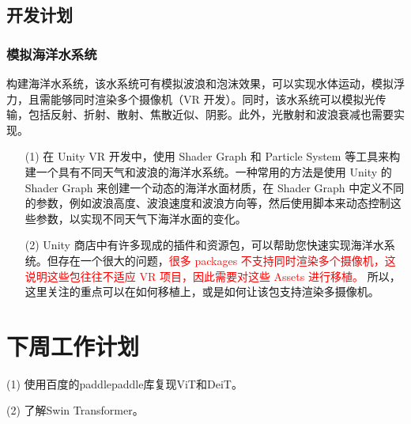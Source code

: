 \documentclass[letterpaper,10pt]{article}
\begin{document}
	\subsection{开发计划}
	
		\subsubsection{模拟海洋水系统}
	
		构建海洋水系统，该水系统可有模拟波浪和泡沫效果，可以实现水体运动，模拟浮力，且需能够同时渲染多个摄像机（VR 开发）。同时，该水系统可以模拟光传输，包括反射、折射、散射、焦散近似、阴影。此外，光散射和波浪衰减也需要实现。
		
		\begin{itemize}
			\item [(1)] 
			在 Unity VR 开发中，使用 Shader Graph 和 Particle System 等工具来构建一个具有不同天气和波浪的海洋水系统。一种常用的方法是使用 Unity 的 Shader Graph 来创建一个动态的海洋水面材质，在 Shader Graph 中定义不同的参数，例如波浪高度、波浪速度和波浪方向等，然后使用脚本来动态控制这些参数，以实现不同天气下海洋水面的变化。
		
			\item [(2)]
			Unity 商店中有许多现成的插件和资源包，可以帮助您快速实现海洋水系统。但存在一个很大的问题，\textcolor{red}{很多 packages 不支持同时渲染多个摄像机，这说明这些包往往不适应 VR 项目，因此需要对这些 Assets 进行移植。} 所以，这里关注的重点可以在如何移植上，或是如何让该包支持渲染多摄像机。 
		\end{itemize}
	
	
	\section{下周工作计划}
	
	(1) 使用百度的paddlepaddle库复现ViT和DeiT。
	
	(2) 了解Swin Transformer。
	
	
\end{document}
